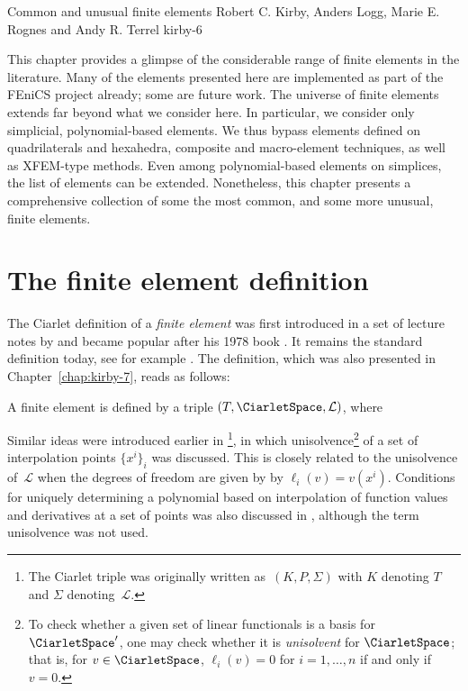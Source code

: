               {Common and unusual finite elements}
              {Robert C. Kirby, Anders Logg, Marie E. Rognes and Andy R. Terrel}
              {kirby-6}

\newcommand{\elmfig}[1]{\texttt{[image: chapters/kirby-6/png/\#1.png]}}
\newcommand{\elmdesc}[1]{\begin{minipage}{4cm} #1 \end{minipage} \\ }

This chapter provides a glimpse of the considerable range of finite
elements in the literature. Many of the elements presented here are
implemented as part of the FEniCS project already; some are future work.
The universe of finite elements extends far beyond what we consider
here. In particular, we consider only simplicial, polynomial-based
elements. We thus bypass elements defined on quadrilaterals and hexahedra,
composite and macro-element techniques, as well as XFEM-type methods. Even
among polynomial-based elements on simplices, the list of elements can be
extended. Nonetheless, this chapter presents a comprehensive collection
of some the most common, and some more unusual, finite elements.

\section{The finite element definition}

The Ciarlet definition of a \emph{finite element} was first introduced
in a set of lecture notes by \citet{Ciarlet1975} and became popular
after his 1978 book \citep{Ciarlet2002}. It remains the standard
definition today, see for example \citet{BrennerScott2008}. The
definition, which was also presented in Chapter~\ref{chap:kirby-7},
reads as follows:
\begin{definition}
  A finite element is defined by a triple
  $(T, \CiarletSpace,\mathcal{L})$, where
  \femdefinition{}
\end{definition}
Similar ideas were introduced earlier in
\citet{CiarletRaviart1972}\footnote{The Ciarlet triple was originally
  written as~$(K, P, \Sigma)$ with $K$ denoting $T$ and $\Sigma$
  denoting~$\mathcal{L}$.}, in which unisolvence\footnote{To check
  whether a given set of linear functionals is a basis for
  $\CiarletSpace'$, one may check whether it is \emph{unisolvent} for
  $\CiarletSpace$; that is, for $v \in \CiarletSpace$, $\ell_i(v) = 0$
  for $i = 1, \dots, n$ if and only if $v = 0$.} of a set of
interpolation points $\{x^i\}_i$ was discussed. This is closely
related to the unisolvence of~$\mathcal{L}$ when the degrees of
freedom are given by by $\ell_i(v) = v(x^i)$.  Conditions for uniquely
determining a polynomial based on interpolation of function values and
derivatives at a set of points was also discussed in
\citet{BrambleZlamal1970}, although the term unisolvence was not used.

